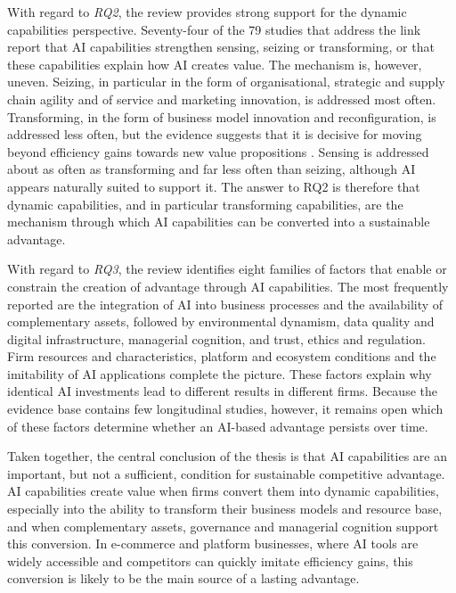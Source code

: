 With regard to \emph{RQ2}, the review provides strong support for the dynamic capabilities perspective. Seventy-four of the 79 studies that address the link report that AI capabilities strengthen sensing, seizing or transforming, or that these capabilities explain how AI creates value. The mechanism is, however, uneven. Seizing, in particular in the form of organisational, strategic and supply chain agility and of service and marketing innovation, is addressed most often. Transforming, in the form of business model innovation and reconfiguration, is addressed less often, but the evidence suggests that it is decisive for moving beyond efficiency gains towards new value propositions \parencite[1]{huang2026}. Sensing is addressed about as often as transforming and far less often than seizing, although AI appears naturally suited to support it. The answer to RQ2 is therefore that dynamic capabilities, and in particular transforming capabilities, are the mechanism through which AI capabilities can be converted into a sustainable advantage.

With regard to \emph{RQ3}, the review identifies eight families of factors that enable or constrain the creation of advantage through AI capabilities. The most frequently reported are the integration of AI into business processes and the availability of complementary assets, followed by environmental dynamism, data quality and digital infrastructure, managerial cognition, and trust, ethics and regulation. Firm resources and characteristics, platform and ecosystem conditions and the imitability of AI applications complete the picture. These factors explain why identical AI investments lead to different results in different firms. Because the evidence base contains few longitudinal studies, however, it remains open which of these factors determine whether an AI-based advantage persists over time.

Taken together, the central conclusion of the thesis is that AI capabilities are an important, but not a sufficient, condition for sustainable competitive advantage. AI capabilities create value when firms convert them into dynamic capabilities, especially into the ability to transform their business models and resource base, and when complementary assets, governance and managerial cognition support this conversion. In e-commerce and platform businesses, where AI tools are widely accessible and competitors can quickly imitate efficiency gains, this conversion is likely to be the main source of a lasting advantage.

